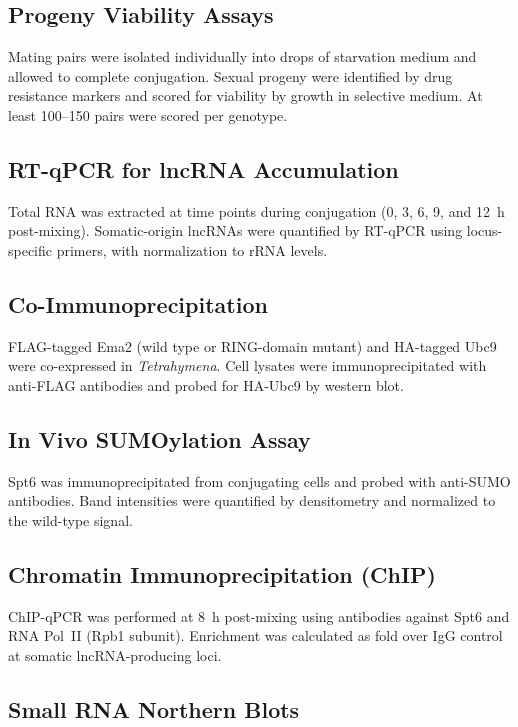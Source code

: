 \documentclass[11pt]{article}
\begin{document}
\subsection{Progeny Viability Assays}

Mating pairs were isolated individually into drops of starvation medium and allowed to complete conjugation. Sexual progeny were identified by drug resistance markers and scored for viability by growth in selective medium. At least 100--150 pairs were scored per genotype.

\subsection{RT-qPCR for lncRNA Accumulation}

Total RNA was extracted at time points during conjugation (0, 3, 6, 9, and 12~h post-mixing). Somatic-origin lncRNAs were quantified by RT-qPCR using locus-specific primers, with normalization to rRNA levels.

\subsection{Co-Immunoprecipitation}

FLAG-tagged Ema2 (wild type or RING-domain mutant) and HA-tagged Ubc9 were co-expressed in \textit{Tetrahymena}. Cell lysates were immunoprecipitated with anti-FLAG antibodies and probed for HA-Ubc9 by western blot.

\subsection{In Vivo SUMOylation Assay}

Spt6 was immunoprecipitated from conjugating cells and probed with anti-SUMO antibodies. Band intensities were quantified by densitometry and normalized to the wild-type signal.

\subsection{Chromatin Immunoprecipitation (ChIP)}

ChIP-qPCR was performed at 8~h post-mixing using antibodies against Spt6 and RNA Pol~II (Rpb1 subunit). Enrichment was calculated as fold over IgG control at somatic lncRNA-producing loci.

\subsection{Small RNA Northern Blots}
\end{document}
